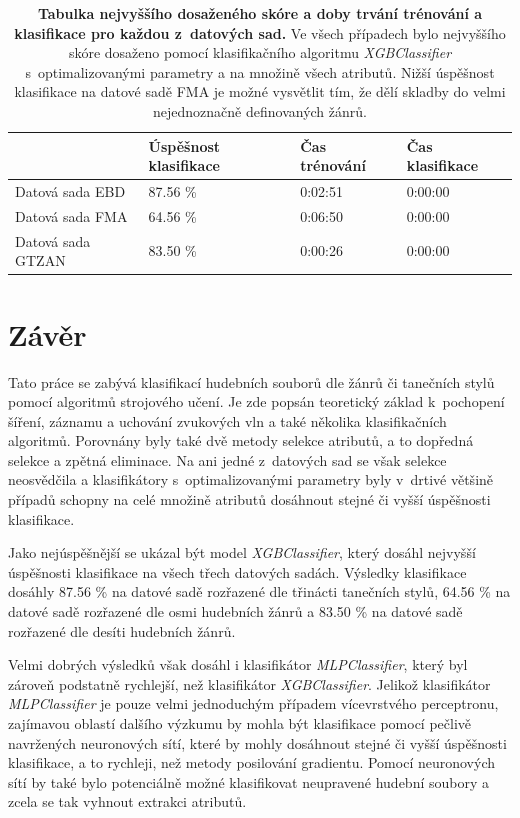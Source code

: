 \begin{table}[H]
	\vskip6pt
    \caption{\textbf{Tabulka nejvyššího dosaženého skóre a doby trvání trénování a klasifikace pro každou z~datových sad.} Ve všech případech bylo nejvyššího skóre dosaženo pomocí klasifikačního algoritmu \textit{XGBClassifier} s~optimalizovanými parametry a na množině všech atributů. Nižší úspěšnost klasifikace na datové sadě FMA je možné vysvětlit tím, že dělí skladby do velmi nejednoznačně definovaných žánrů.}
    \label{score_optimised_CV_test_set}  
    \vskip6pt
	\centering
    \begin{tabular}{|l|lll|}
    \hline
                        & Úspěšnost klasifikace & Čas trénování & Čas klasifikace \\ \hline
    Datová sada EBD   & 87.56 \%              & 0:02:51       & 0:00:00         \\
    \rowcolor[HTML]{EFEFEF} 
    Datová sada FMA   & 64.56 \%              & 0:06:50       & 0:00:00         \\
    Datová sada GTZAN & 83.50 \%              & 0:00:26       & 0:00:00         \\ \hline
    \end{tabular}
\end{table}

\chapter{Závěr}
\label{zaver}
Tato práce se zabývá klasifikací hudebních souborů dle žánrů či tanečních stylů pomocí algoritmů strojového učení. Je zde popsán teoretický základ k~pochopení šíření, záznamu a uchování zvukových vln a také několika klasifikačních algoritmů. Porovnány byly také dvě metody selekce atributů, a to dopředná selekce a zpětná eliminace. Na ani jedné z~datových sad se však selekce neosvědčila a klasifikátory s~optimalizovanými parametry byly v~drtivé většině případů schopny na celé množině atributů dosáhnout stejné či vyšší úspěšnosti klasifikace.

Jako nejúspěšnější se ukázal být model \textit{XGBClassifier}, který dosáhl nejvyšší úspěšnosti klasifikace na všech třech datových sadách. Výsledky klasifikace dosáhly 87.56 \% na datové sadě  rozřazené dle třinácti tanečních stylů, 64.56 \% na datové sadě  rozřazené dle osmi hudebních žánrů a 83.50 \% na datové sadě  rozřazené dle desíti hudebních žánrů.

Velmi dobrých výsledků však dosáhl i klasifikátor \textit{MLPClassifier}, který byl zároveň podstatně rychlejší, než klasifikátor \textit{XGBClassifier}. Jelikož klasifikátor \textit{MLPClassifier} je pouze velmi jednoduchým případem vícevrstvého perceptronu, zajímavou oblastí dalšího výzkumu by mohla být klasifikace pomocí pečlivě navržených neuronových sítí, které by mohly dosáhnout stejné či vyšší úspěšnosti klasifikace, a to rychleji, než metody posilování gradientu. Pomocí neuronových sítí by také bylo potenciálně možné klasifikovat neupravené hudební soubory a zcela se tak vyhnout extrakci atributů.

